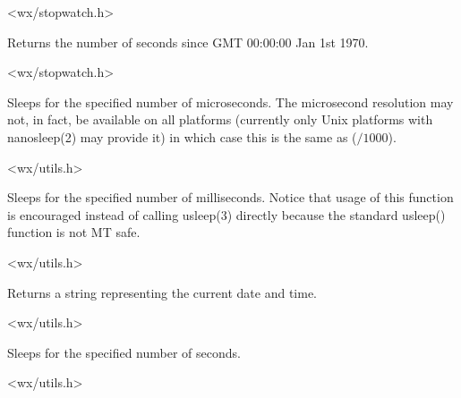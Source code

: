 
<wx/stopwatch.h>


\label{wxgetutctime}


Returns the number of seconds since GMT 00:00:00 Jan 1st 1970.




<wx/stopwatch.h>


\label{wxmicrosleep}


Sleeps for the specified number of microseconds. The microsecond resolution may
not, in fact, be available on all platforms (currently only Unix platforms with
nanosleep(2) may provide it) in which case this is the same as
($/1000$).


<wx/utils.h>


\label{wxmillisleep}


Sleeps for the specified number of milliseconds. Notice that usage of this
function is encouraged instead of calling usleep(3) directly because the
standard usleep() function is not MT safe.


<wx/utils.h>


\label{wxnow}


Returns a string representing the current date and time.


<wx/utils.h>


\label{wxsleep}


Sleeps for the specified number of seconds.


<wx/utils.h>


